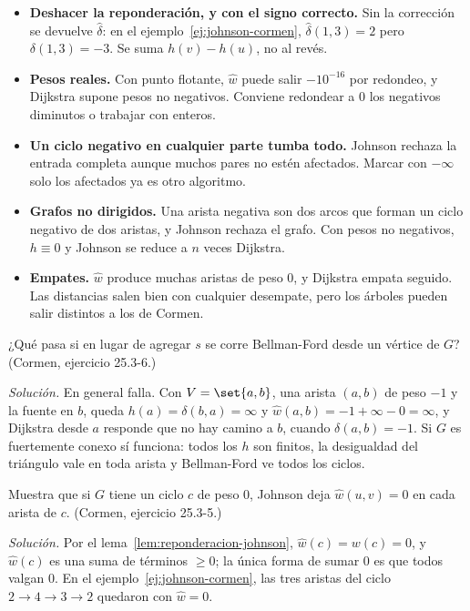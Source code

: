 \documentclass[11pt,letterpaper]{article}
\begin{document}
\begin{ojo}[breakable]
  \begin{itemize}[itemsep=0.2em, leftmargin=1.2em]
    \item \textbf{Deshacer la reponderación, y con el signo correcto.}
          Sin la corrección se devuelve $\hat{\delta}$: en el
          ejemplo~\ref{ej:johnson-cormen},
          $\hat{\delta}(1, 3) = 2$ pero $\delta(1, 3) = -3$. Se suma
          $h(v) - h(u)$, no al revés.
    \item \textbf{Pesos reales.} Con punto flotante, $\hat{w}$ puede
          salir $-10^{-16}$ por redondeo, y Dijkstra supone pesos no
          negativos. Conviene redondear a $0$ los negativos diminutos
          o trabajar con enteros.
    \item \textbf{Un ciclo negativo en cualquier parte tumba todo.}
          Johnson rechaza la entrada completa aunque muchos pares no
          estén afectados. Marcar con $-\infty$ solo los afectados ya
          es otro algoritmo.
    \item \textbf{Grafos no dirigidos.} Una arista negativa son dos
          arcos que forman un ciclo negativo de dos aristas, y Johnson
          rechaza el grafo. Con pesos no negativos, $h \equiv 0$ y
          Johnson se reduce a $n$ veces Dijkstra.
    \item \textbf{Empates.} $\hat{w}$ produce muchas aristas de peso
          $0$, y Dijkstra empata seguido. Las distancias salen bien
          con cualquier desempate, pero los árboles pueden salir
          distintos a los de Cormen.
  \end{itemize}
\end{ojo}

\begin{ejercicio}
  \label{ej:fuente-johnson}
  ¿Qué pasa si en lugar de agregar $s$ se corre Bellman-Ford desde un
  vértice de $G$? (Cormen, ejercicio 25.3-6.)

  \emph{Solución.} En general falla. Con $V = \set{a, b}$, una arista
  $(a, b)$ de peso $-1$ y la fuente en $b$, queda
  $h(a) = \delta(b, a) = \infty$ y
  $\hat{w}(a, b) = -1 + \infty - 0 = \infty$, y Dijkstra desde $a$
  responde que no hay camino a $b$, cuando $\delta(a, b) = -1$. Si $G$
  es fuertemente conexo sí funciona: todos los $h$ son finitos, la
  desigualdad del triángulo vale en toda arista y Bellman-Ford ve
  todos los ciclos.
\end{ejercicio}

\begin{ejercicio}
  Muestra que si $G$ tiene un ciclo $c$ de peso $0$, Johnson deja
  $\hat{w}(u, v) = 0$ en cada arista de $c$. (Cormen, ejercicio
  25.3-5.)

  \emph{Solución.} Por el lema~\ref{lem:reponderacion-johnson},
  $\hat{w}(c) = w(c) = 0$, y $\hat{w}(c)$ es una suma de términos
  $\ge 0$; la única forma de sumar $0$ es que todos valgan $0$. En el
  ejemplo~\ref{ej:johnson-cormen}, las tres aristas del ciclo
  $2 \to 4 \to 3 \to 2$ quedaron con $\hat{w} = 0$.
\end{ejercicio}
\end{document}
